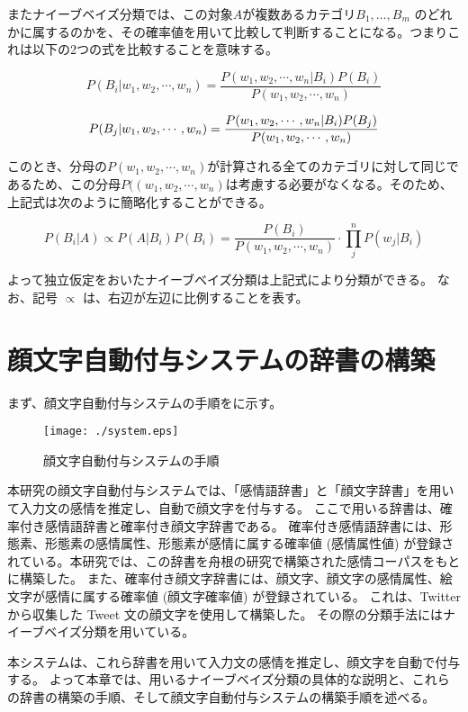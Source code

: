 \documentclass[11pt,a4j]{jsarticle}
\begin{document}
またナイーブベイズ分類では、この対象$A$が複数あるカテゴリ$B_1, \ldots ,B_m$ のどれかに属するのかを、その確率値を用いて比較して判断することになる。つまりこれは以下の2つの式を比較することを意味する。

\[
P(B_i|w_1, w_2, \cdots ,w_n) = \frac{P(w_1, w_2, \cdots ,w_n|B_i)P(B_i)}{P(w_1, w_2, \cdots ,w_n)}
\]

\[
P(B_j|w_1, w_2, \cdots ,w_n) = \frac{P(w_1, w_2, \cdots ,w_n|B_i)P(B_j)}{P(w_1, w_2, \cdots ,w_n)}\\
\]

このとき、分母の$P(w_1, w_2, \cdots ,w_n)$が計算される全てのカテゴリに対して同じであるため、この分母$P((w_1, w_2, \cdots ,w_n)$は考慮する必要がなくなる。そのため、上記式は次のように簡略化することができる。

\begin{equation}
  P(B_i|A)\propto P(A|B_i)P(B_i) = \frac{P(B_i)}{P(w_1, w_2, \cdots ,w_n)} \cdot \prod_{j}^{n} P(w_j|B_i)
\end{equation}

よって独立仮定をおいたナイーブベイズ分類は上記式により分類ができる。
なお、記号 $\propto$ は、右辺が左辺に比例することを表す。


\section{顔文字自動付与システムの辞書の構築}\label{sec:system}
まず、顔文字自動付与システムの手順をに示す。

\begin{figure}[h]
  \texttt{[image: ./system.eps]}
  \caption{顔文字自動付与システムの手順}
  \label{fig:system}
\end{figure}

本研究の顔文字自動付与システムでは、「感情語辞書」と「顔文字辞書」を用いて入力文の感情を推定し、自動で顔文字を付与する。
ここで用いる辞書は、確率付き感情語辞書と確率付き顔文字辞書である。
確率付き感情語辞書には、形態素、形態素の感情属性、形態素が感情に属する確率値 (感情属性値) が登録されている。本研究では、この辞書を舟根の研究で構築された感情コーパスをもとに構築した。
また、確率付き顔文字辞書には、顔文字、顔文字の感情属性、絵文字が感情に属する確率値 (顔文字確率値) が登録されている。
これは、Twitter から収集した Tweet 文の顔文字を使用して構築した。
その際の分類手法にはナイーブベイズ分類を用いている。

本システムは、これら辞書を用いて入力文の感情を推定し、顔文字を自動で付与する。
よって本章では、用いるナイーブベイズ分類の具体的な説明と、これらの辞書の構築の手順、そして顔文字自動付与システムの構築手順を述べる。
\end{document}
